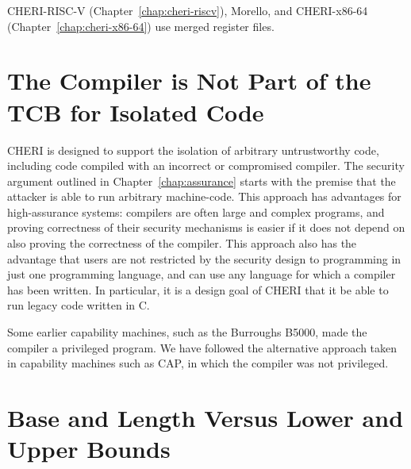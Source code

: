 CHERI-RISC-V (Chapter~\ref{chap:cheri-riscv}),
Morello, and CHERI-x86-64 (Chapter~\ref{chap:cheri-x86-64}) use merged register files.

\section{The Compiler is Not Part of the TCB for Isolated Code}

CHERI is designed to support the isolation of arbitrary untrustworthy code,
including code compiled with an incorrect or compromised compiler.
The security argument outlined in
Chapter~\ref{chap:assurance} starts with the premise that the attacker is able to
run arbitrary machine-code. This approach has advantages for high-assurance systems:
compilers are often large and complex programs, and proving correctness of their
security mechanisms is easier if it does not depend on also proving the correctness
of the compiler. This approach also has the advantage that users are not restricted
by the security design to programming in just one programming language, and can use
any language for which a compiler has been written. In particular, it is a design
goal of CHERI that it be able to run legacy code written in C.

Some earlier capability machines, such as the Burroughs B5000, made the compiler
a privileged program. We have followed the alternative approach taken in capability machines
such as CAP, in which the compiler was not privileged.


\section{Base and Length Versus Lower and Upper Bounds}

